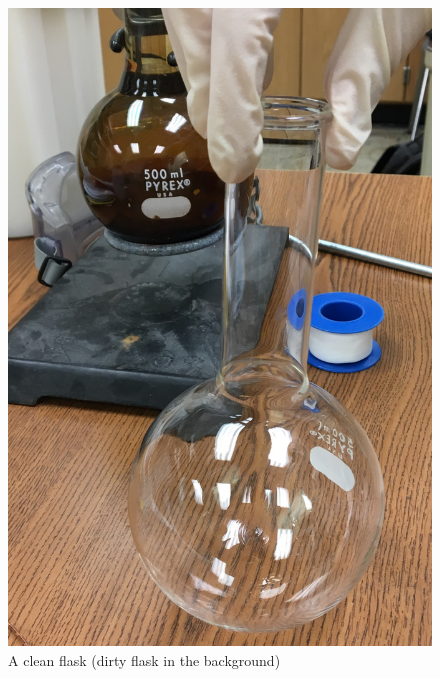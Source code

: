 \documentclass[letterpaper,11pt]{article}
\begin{document}
\begin{figure}[H]
\centering
\includegraphics[width=.25\textwidth]{clean_dirty_flask.jpg}
\caption{A clean flask (dirty flask in the background)}
\label{fig:clean_dirty}
\end{figure}      
\end{document}
